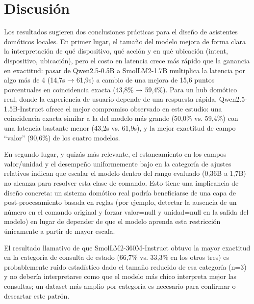 \section{Discusión}

Los resultados sugieren dos conclusiones prácticas para el diseño de
asistentes domóticos locales. En primer lugar, el tamaño del modelo mejora
de forma clara la interpretación de qué dispositivo, qué acción y en qué
ubicación (intent, dispositivo, ubicación), pero el costo en latencia crece
más rápido que la ganancia en exactitud: pasar de Qwen2.5-0.5B a
SmolLM2-1.7B multiplica la latencia por algo más de 4 (14,7s → 61,9s) a
cambio de una mejora de 15,6 puntos porcentuales en coincidencia exacta
(43,8\% → 59,4\%). Para un hub domótico real, donde la experiencia de
usuario depende de una respuesta rápida, Qwen2.5-1.5B-Instruct ofrece el
mejor compromiso observado en este estudio: una coincidencia exacta similar
a la del modelo más grande (50,0\% vs. 59,4\%) con una latencia bastante
menor (43,2s vs. 61,9s), y la mejor exactitud de campo ``valor'' (90,6\%) de
los cuatro modelos.

En segundo lugar, y quizás más relevante, el estancamiento en los campos
valor/unidad y el desempeño uniformemente bajo en la categoría de ajustes
relativos indican que escalar el modelo dentro del rango evaluado (0,36B a
1,7B) no alcanza para resolver esta clase de comando. Esto tiene una
implicancia de diseño concreta: un sistema domótico real podría
beneficiarse de una capa de post-procesamiento basada en reglas (por
ejemplo, detectar la ausencia de un número en el comando original y forzar
valor=null y unidad=null en la salida del modelo) en lugar de depender de
que el modelo aprenda esta restricción únicamente a partir de mayor escala.

El resultado llamativo de que SmolLM2-360M-Instruct obtuvo la mayor
exactitud en la categoría de consulta de estado (66,7\% vs. 33,3\% en los
otros tres) es probablemente ruido estadístico dado el tamaño reducido de
esa categoría (n=3) y no debería interpretarse como que el modelo más chico
interpreta mejor las consultas; un dataset más amplio por categoría es
necesario para confirmar o descartar este patrón.
